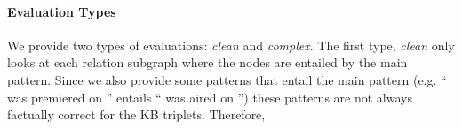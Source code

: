 \paragraph{Evaluation Types}
We provide two types of evaluations: \textit{clean} and \textit{complex}.
The first type, \textit{clean} only looks at each relation subgraph where the nodes are entailed by the main pattern. Since we also provide some patterns that entail the main pattern (e.g. ``\subj{} was premiered on \obj{}'' entails ``\subj{} was aired on \obj{}'') these patterns are not always factually correct for the KB triplets. Therefore, 